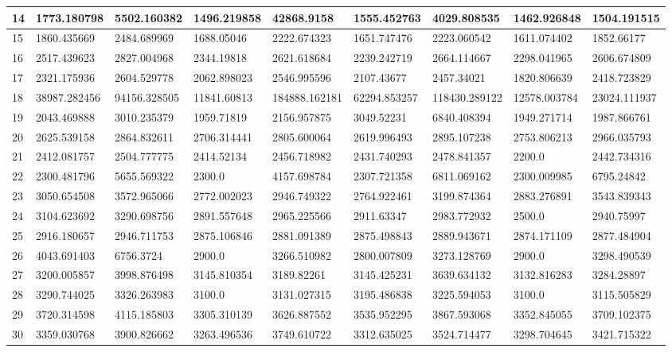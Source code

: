 \begin{table}
\begin{tabular}{|p{0.8cm}|p{1.6cm}|p{1.6cm}|p{1.6cm}|p{1.6cm}|p{1.6cm}|p{1.6cm}|p{1.6cm}|p{1.6cm}|}
 \hline
14  & 1773.180798 & 5502.160382 & 1496.219858 & 42868.9158 & 1555.452763 & 4029.808535 & 1462.926848 & 1504.191515 \\ 
 \hline
15  & 1860.435669 & 2484.689969 & 1688.05046 & 2222.674323 & 1651.747476 & 2223.060542 & 1611.074402 & 1852.66177 \\ 
 \hline
16  & 2517.439623 & 2827.004968 & 2344.19818 & 2621.618684 & 2239.242719 & 2664.114667 & 2298.041965 & 2606.674809 \\ 
 \hline
17  & 2321.175936 & 2604.529778 & 2062.898023 & 2546.995596 & 2107.43677 & 2457.34021 & 1820.806639 & 2418.723829 \\ 
 \hline
18  & 38987.282456 & 94156.328505 & 11841.60813 & 184888.162181 & 62294.853257 & 118430.289122 & 12578.003784 & 23024.111937 \\ 
 \hline
19  & 2043.469888 & 3010.235379 & 1959.71819 & 2156.957875 & 3049.52231 & 6840.408394 & 1949.271714 & 1987.866761 \\ 
 \hline
20  & 2625.539158 & 2864.832611 & 2706.314441 & 2805.600064 & 2619.996493 & 2895.107238 & 2753.806213 & 2966.035793 \\ 
 \hline
21  & 2412.081757 & 2504.777775 & 2414.52134 & 2456.718982 & 2431.740293 & 2478.841357 & 2200.0 & 2442.734316 \\ 
 \hline
22  & 2300.481796 & 5655.569322 & 2300.0 & 4157.698784 & 2307.721358 & 6811.069162 & 2300.009985 & 6795.24842 \\ 
 \hline
23  & 3050.654508 & 3572.965066 & 2772.002023 & 2946.749322 & 2764.922461 & 3199.874364 & 2883.276891 & 3543.839343 \\ 
 \hline
24  & 3104.623692 & 3290.698756 & 2891.557648 & 2965.225566 & 2911.63347 & 2983.772932 & 2500.0 & 2940.75997 \\ 
 \hline
25  & 2916.180657 & 2946.711753 & 2875.106846 & 2881.091389 & 2875.498843 & 2889.943671 & 2874.171109 & 2877.484904 \\ 
 \hline
26  & 4043.691403 & 6756.3724 & 2900.0 & 3266.510982 & 2800.007809 & 3273.128769 & 2900.0 & 3298.490539 \\ 
 \hline
27  & 3200.005857 & 3998.876498 & 3145.810354 & 3189.82261 & 3145.425231 & 3639.634132 & 3132.816283 & 3284.28897 \\ 
 \hline
28  & 3290.744025 & 3326.263983 & 3100.0 & 3131.027315 & 3195.486838 & 3225.594053 & 3100.0 & 3115.505829 \\ 
 \hline
29  & 3720.314598 & 4115.185803 & 3305.310139 & 3626.887552 & 3535.952295 & 3867.593068 & 3352.845055 & 3709.102375 \\ 
 \hline
30  & 3359.030768 & 3900.826662 & 3263.496536 & 3749.610722 & 3312.635025 & 3524.714477 & 3298.704645 & 3421.715322 \\ 
 \hline


 \end{tabular}
\end{table}


